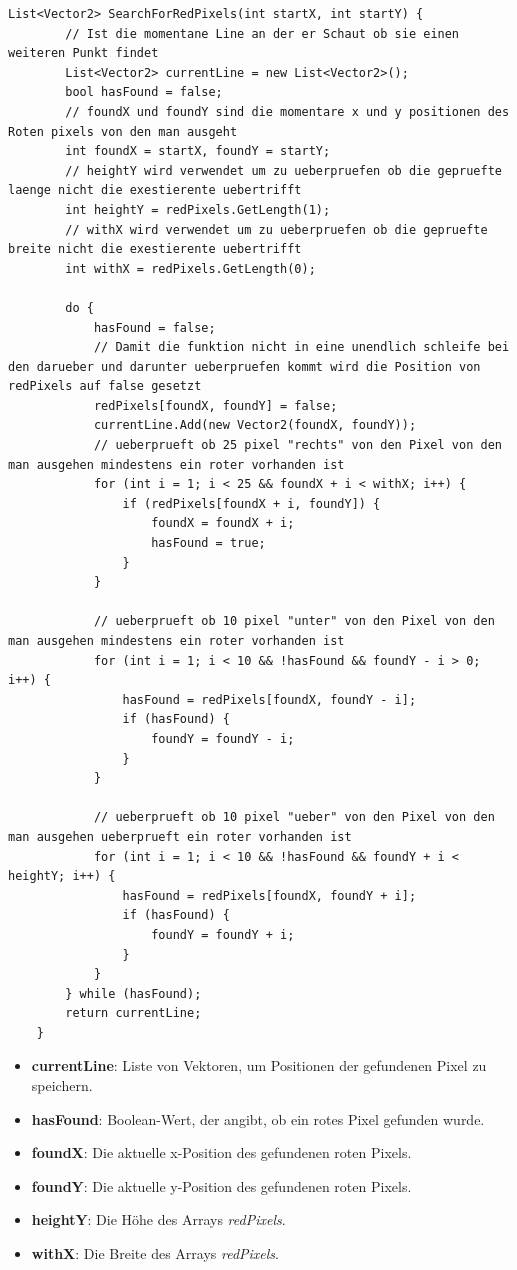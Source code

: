 \begin{lstlisting}[style=csharp, caption={Kabel suche}, label=code:SearchForRedPixels]
List<Vector2> SearchForRedPixels(int startX, int startY) {
        // Ist die momentane Line an der er Schaut ob sie einen weiteren Punkt findet
        List<Vector2> currentLine = new List<Vector2>();
        bool hasFound = false;
        // foundX und foundY sind die momentare x und y positionen des Roten pixels von den man ausgeht
        int foundX = startX, foundY = startY;
        // heightY wird verwendet um zu ueberpruefen ob die gepruefte laenge nicht die exestierente uebertrifft
        int heightY = redPixels.GetLength(1);
        // withX wird verwendet um zu ueberpruefen ob die gepruefte breite nicht die exestierente uebertrifft
        int withX = redPixels.GetLength(0);

        do {
            hasFound = false;
            // Damit die funktion nicht in eine unendlich schleife bei den darueber und darunter ueberpruefen kommt wird die Position von redPixels auf false gesetzt
            redPixels[foundX, foundY] = false;
            currentLine.Add(new Vector2(foundX, foundY));
            // ueberprueft ob 25 pixel "rechts" von den Pixel von den man ausgehen mindestens ein roter vorhanden ist
            for (int i = 1; i < 25 && foundX + i < withX; i++) {
                if (redPixels[foundX + i, foundY]) {
                    foundX = foundX + i;
                    hasFound = true;
                }
            }

            // ueberprueft ob 10 pixel "unter" von den Pixel von den man ausgehen mindestens ein roter vorhanden ist
            for (int i = 1; i < 10 && !hasFound && foundY - i > 0; i++) {
                hasFound = redPixels[foundX, foundY - i];
                if (hasFound) {
                    foundY = foundY - i;
                }
            }

            // ueberprueft ob 10 pixel "ueber" von den Pixel von den man ausgehen ueberprueft ein roter vorhanden ist
            for (int i = 1; i < 10 && !hasFound && foundY + i < heightY; i++) {
                hasFound = redPixels[foundX, foundY + i];
                if (hasFound) {
                    foundY = foundY + i;
                }
            }
        } while (hasFound);
        return currentLine;
    }
\end{lstlisting}
\begin{itemize}
    \item \textbf{currentLine}: Liste von Vektoren, um Positionen der gefundenen Pixel zu speichern.
    \item \textbf{hasFound}: Boolean-Wert, der angibt, ob ein rotes Pixel gefunden wurde.
    \item \textbf{foundX}: Die aktuelle x-Position des gefundenen roten Pixels.
    \item \textbf{foundY}: Die aktuelle y-Position des gefundenen roten Pixels.
    \item \textbf{heightY}: Die Höhe des Arrays \textit{redPixels}.
    \item \textbf{withX}: Die Breite des Arrays \textit{redPixels}.
\end{itemize}


